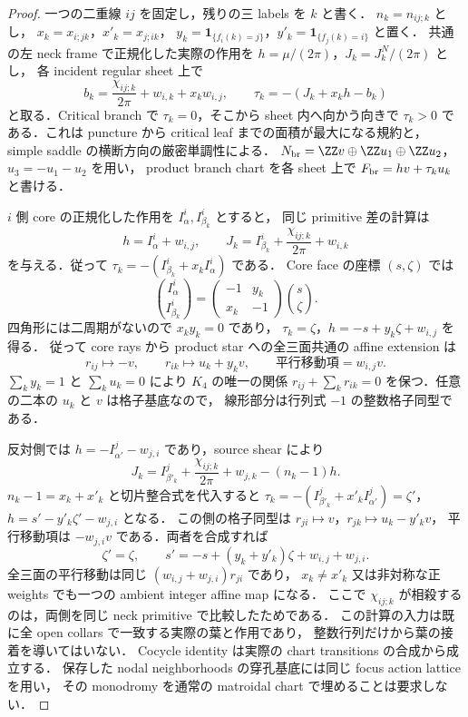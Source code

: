 \begin{proof}
一つの二重線 $ij$ を固定し，残りの三 labels を $k$ と書く．
$n_k=n_{ij;k}$ とし，
$x_k=x_{i;jk}$，$x'_k=x_{j;ik}$，
$y_k=\mathbf1_{\{f_i(k)=j\}}$，$y'_k=\mathbf1_{\{f_j(k)=i\}}$ と置く．
共通の左 neck frame で正規化した実際の作用を
$h=\mu/(2\pi)$，$J_k=J_k^N/(2\pi)$ とし，
各 incident regular sheet 上で
\begin{equation}\label{ke:eq:quintic-branch-action-coordinates}
 b_k=\frac{\chi_{ij;k}}{2\pi}+w_{i,k}+x_kw_{i,j},\qquad
 \tau_k=-(J_k+x_kh-b_k)
\end{equation}
と取る．Critical branch で $\tau_k=0$，そこから sheet 内へ向かう向きで
$\tau_k>0$ である．これは puncture から critical leaf までの面積が最大になる規約と，
simple saddle の横断方向の厳密単調性による．
$N_{\rm br}=\ZZ v\oplus\ZZ u_1\oplus\ZZ u_2$，$u_3=-u_1-u_2$ を用い，
product branch chart を各 sheet 上で $F_{\rm br}=hv+\tau_ku_k$ と書ける．

$i$ 側 core の正規化した作用を $I^i_\alpha,I^i_{\beta_k}$ とすると，
同じ primitive 差の計算は
\[
 h=I^i_\alpha+w_{i,j},\qquad
 J_k=I^i_{\beta_k}+\frac{\chi_{ij;k}}{2\pi}+w_{i,k}
\]
を与える．従って $\tau_k=-(I^i_{\beta_k}+x_kI^i_\alpha)$ である．
Core face の座標 $(s,\zeta)$ では
\[
 \binom{I^i_\alpha}{I^i_{\beta_k}}
 =\begin{pmatrix}-1&y_k\\x_k&-1\end{pmatrix}\binom{s}{\zeta}.
\]
四角形には二周期がないので $x_ky_k=0$ であり，
$\tau_k=\zeta$，$h=-s+y_k\zeta+w_{i,j}$ を得る．
従って core rays から product star への全三面共通の affine extension は
\begin{equation}\label{ke:eq:quintic-core-branch-extension}
 r_{ij}\longmapsto-v,\qquad
 r_{ik}\longmapsto u_k+y_kv,\qquad
 \text{平行移動項}=w_{i,j}v.
\end{equation}
$\sum_k y_k=1$ と $\sum_k u_k=0$ により $K_4$ の唯一の関係
$r_{ij}+\sum_k r_{ik}=0$ を保つ．任意の二本の $u_k$ と $v$ は格子基底なので，
線形部分は行列式 $-1$ の整数格子同型である．

反対側では $h=-I^j_{\alpha'}-w_{j,i}$ であり，source shear により
\[
 J_k=I^j_{\beta'_k}+\frac{\chi_{ij;k}}{2\pi}+w_{j,k}-(n_k-1)h.
\]
$n_k-1=x_k+x'_k$ と切片整合式を代入すると
$\tau_k=-(I^j_{\beta'_k}+x'_kI^j_{\alpha'})=\zeta'$，
$h=s'-y'_k\zeta'-w_{j,i}$ となる．
この側の格子同型は $r_{ji}\mapsto v$，$r_{jk}\mapsto u_k-y'_kv$，
平行移動項は $-w_{j,i}v$ である．両者を合成すれば
\begin{equation}\label{ke:eq:quintic-affine-full-transition}
 \zeta'=\zeta,\qquad
 s'=-s+(y_k+y'_k)\zeta+w_{i,j}+w_{j,i}.
\end{equation}
全三面の平行移動は同じ $(w_{i,j}+w_{j,i})r_{ji}$ であり，
$x_k\ne x'_k$ 又は非対称な正 weights でも一つの ambient integer affine map になる．
ここで $\chi_{ij;k}$ が相殺するのは，両側を同じ neck primitive で比較したためである．
この計算の入力は既に全 open collars で一致する実際の葉と作用であり，
整数行列だけから葉の接着を導いてはいない．
Cocycle identity は実際の chart transitions の合成から成立する．
保存した nodal neighborhoods の穿孔基底には同じ focus action lattice を用い，
その monodromy を通常の matroidal chart で埋めることは要求しない．


\end{proof}
